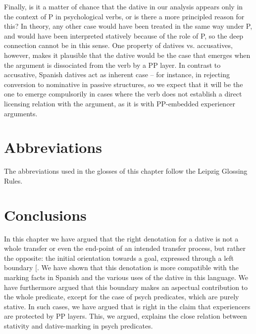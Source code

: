 \documentclass[output=paper,colorlinks,citecolor=brown,nonflat]{langsci/langscibook}
\begin{document}
Finally, is it a matter of chance that the dative in our analysis appears only in the context of P in psychological verbs, or is there a more principled reason for this? In theory, any other case would have been treated in the same way under P, and would have been interpreted statively because of the role of P, so the deep connection cannot be in this sense. One property of datives vs. accusatives, however, makes it plausible that the dative would be the case that emerges when the argument is dissociated from the verb by a PP layer. In contrast to accusative, Spanish datives act as inherent case – for instance, in rejecting conversion to nominative in passive structures, so we expect that it will be the one to emerge compulsorily in cases where the verb does not establish a direct licensing relation with the argument, as it is with PP-embedded experiencer arguments.

\section*{Abbreviations}
The abbreviations used in the glosses of this chapter follow the Leipzig Glossing Rules.

\section{Conclusions}\label{sec:fabregas:4}

In this chapter we have argued that the right denotation for a dative is not a whole transfer or even the end-point of an intended transfer process, but rather the opposite: the initial orientation towards a goal, expressed through a left boundary [. We have shown that this denotation is more compatible with the marking facts in Spanish and the various uses of the dative in this language. We have furthermore argued that this boundary makes an aspectual contribution to the whole predicate, except for the case of psych predicates, which are purely stative. In such cases, we have argued that \citet{Landau2010} is right in the claim that experiencers are protected by PP layers. This, we argued, explains the close relation between stativity and dative-marking in psych predicates.

\sloppy\printbibliography[heading=subbibliography,notkeyword=this]
\end{document}
